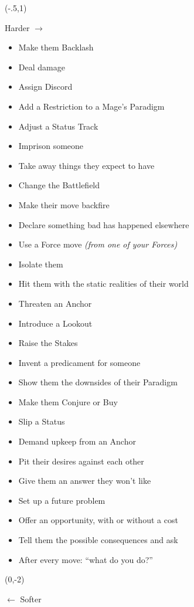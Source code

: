 \documentclass[letterpaper,10pt]{article}
\newcommand{\SECTION}[1]{\vspace{.5em}{\noindent\titlefont\LARGE\textbf{#1}}

}
\begin{document}
\begin{multicols}{2}
\SECTION{Your Moves}
\begin{textblock}{1}(-.5,1)
\begin{sideways}
\color{Gray}
{\large Harder $\rightarrow$}
\end{sideways}
\end{textblock}
\begin{itemize}
\item Make them Backlash
\item Deal damage
\item Assign Discord
\item Add a Restriction to a Mage’s Paradigm
\item Adjust a Status Track
\item Imprison someone
\item Take away things they expect to have
\item Change the Battlefield
\bigskip
\item Make their move backfire
\item Declare something bad has happened elsewhere
\item Use a Force move \textit{(from one of your Forces)}
\item Isolate them
\item Hit them with the static realities of their world
\bigskip
\item Threaten an Anchor
\item Introduce a Lookout
\item Raise the Stakes
\item Invent a predicament for someone
\item Show them the downsides of their Paradigm
\item Make them Conjure or Buy
\item Slip a Status
\item Demand upkeep from an Anchor
\item Pit their desires against each other
\item Give them an answer they won't like
\item Set up a future problem
\item Offer an opportunity, with or without a cost
\item Tell them the possible consequences and ask
\item After every move: ``what do you do?''
\end{itemize}
\begin{textblock}{1}(0,-2)
\begin{sideways}
\color{Gray}
{\large $\leftarrow$ Softer}
\end{sideways}
\end{textblock}
\columnbreak


\end{multicols}
\end{document}

